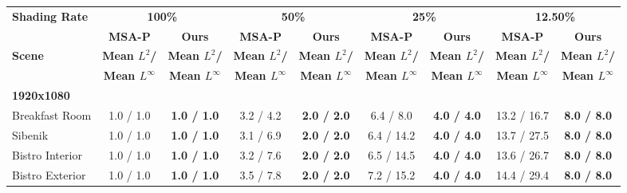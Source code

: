 \begin{table*}[t]
	\scriptsize
	\setlength{\tabcolsep}{3pt}
	\centering
	\begin{tabular}{l cc|cc|cc|cc}
\textbf{Shading   Rate}       & \multicolumn{2}{c|}{\textbf{100\%}}                 & \multicolumn{2}{c|}{\textbf{50\%}}                  & \multicolumn{2}{c|}{\textbf{25\%}}                  & \multicolumn{2}{c}{\textbf{12.50\%}}               \\
& \textbf{MSA-P}       & \textbf{Ours}               & \textbf{MSA-P}       & \textbf{Ours}               & \textbf{MSA-P}       & \textbf{Ours}               & \textbf{MSA-P}       & \textbf{Ours}               \\
\textbf{Scene}                & \textbf{Mean $L^2$/}   & \textbf{Mean $L^2$/}          & \textbf{Mean $L^2$/}   & \textbf{Mean $L^2$/}          & \textbf{Mean $L^2$/}   & \textbf{Mean $L^2$/}          & \textbf{Mean $L^2$/}   & \textbf{Mean $L^2$/}          \\
& \textbf{Mean $L^\infty$} & \textbf{Mean $L^\infty$}        & \textbf{Mean $L^\infty$} & \textbf{Mean $L^\infty$}        & \textbf{Mean $L^\infty$} & \textbf{Mean $L^\infty$}        & \textbf{Mean $L^\infty$} & \textbf{Mean $L^\infty$}        \\
\hline
\textbf{1920x1080}            &                      &                             &                      &                             &                      &                             &                      &                             \\
Breakfast Room                & 1.0 / 1.0            & \textbf{1.0 / 1.0}          & 3.2 / 4.2            & \textbf{2.0 / 2.0}          & 6.4 / 8.0            & \textbf{4.0 / 4.0}          & 13.2 / 16.7          & \textbf{8.0 / 8.0}          \\
            		Sibenik                       & 1.0 / 1.0            & \textbf{1.0 / 1.0}          & 3.1 / 6.9            & \textbf{2.0 / 2.0}          & 6.4 / 14.2           & \textbf{4.0 / 4.0}          & 13.7 / 27.5          & \textbf{8.0 / 8.0}          \\
            		Bistro Interior               & 1.0 / 1.0            & \textbf{1.0 / 1.0}          & 3.2 / 7.6            & \textbf{2.0 / 2.0}          & 6.5 / 14.5           & \textbf{4.0 / 4.0}          & 13.6 / 26.7          & \textbf{8.0 / 8.0}          \\
            		Bistro Exterior               & 1.0 / 1.0            & \textbf{1.0 / 1.0}          & 3.5 / 7.8            & \textbf{2.0 / 2.0}          & 7.2 / 15.2           & \textbf{4.0 / 4.0}          & 14.4 / 29.4          & \textbf{8.0 / 8.0}          \\

\end{tabular}
\end{table*}
